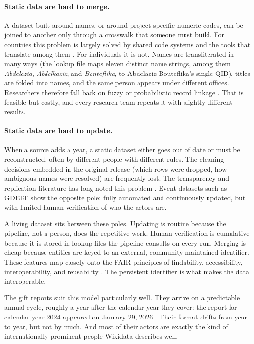 \documentclass[11pt]{article}
\begin{document}
\paragraph{Static data are hard to merge.} A dataset built around names, or around project-specific numeric codes, can be joined to another only through a crosswalk that someone must build. For countries this problem is largely solved by shared code systems and the tools that translate among them \citep{arelbundock2018countrycode}. For individuals it is not. Names are transliterated in many ways (the lookup file maps eleven distinct name strings, among them \emph{Abdelazia}, \emph{Abdelkaziz}, and \emph{Bonteflika}, to Abdelaziz Bouteflika's single QID), titles are folded into names, and the same person appears under different offices. Researchers therefore fall back on fuzzy or probabilistic record linkage \citep{enamorado2019using}. That is feasible but costly, and every research team repeats it with slightly different results.

\paragraph{Static data are hard to update.} When a source adds a year, a static dataset either goes out of date or must be reconstructed, often by different people with different rules. The cleaning decisions embedded in the original release (which rows were dropped, how ambiguous names were resolved) are frequently lost. The transparency and replication literature has long noted this problem \citep{king1995replication,lupia2014openness}. Event datasets such as GDELT \citep{leetaru2013gdelt} show the opposite pole: fully automated and continuously updated, but with limited human verification of who the actors are.

A living dataset sits between these poles. Updating is routine because the pipeline, not a person, does the repetitive work. Human verification is cumulative because it is stored in lookup files the pipeline consults on every run. Merging is cheap because entities are keyed to an external, community-maintained identifier. These features map closely onto the FAIR principles of findability, accessibility, interoperability, and reusability \citep{wilkinson2016fair}. The persistent identifier is what makes the data interoperable.

The gift reports suit this model particularly well. They arrive on a predictable annual cycle, roughly a year after the calendar year they cover: the report for calendar year 2024 appeared on January 29, 2026 \citep{fr2026gifts}. Their format drifts from year to year, but not by much. And most of their actors are exactly the kind of internationally prominent people Wikidata describes well.
\end{document}
